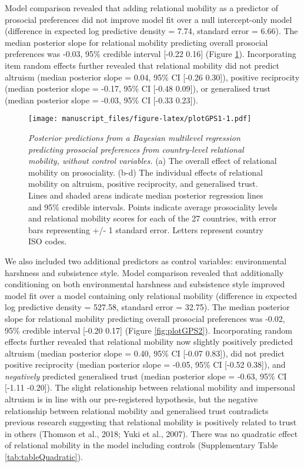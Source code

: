 \documentclass[
  man,floatsintext]{apa6}
\begin{document}
Model comparison revealed that adding relational mobility as a predictor of prosocial preferences did not improve model fit over a null intercept-only model (difference in expected log predictive density = 7.74, standard error = 6.66). The median posterior slope for relational mobility predicting overall prosocial preferences was -0.03, 95\% credible interval {[}-0.22 0.16{]} (Figure \ref{fig:plotGPS1}). Incorporating item random effects further revealed that relational mobility did not predict altruism (median posterior slope = 0.04, 95\% CI {[}-0.26 0.30{]}), positive reciprocity (median posterior slope = -0.17, 95\% CI {[}-0.48 0.09{]}), or generalised trust (median posterior slope = -0.03, 95\% CI {[}-0.33 0.23{]}).



\begin{figure}
\centering
\texttt{[image: manuscript\_files/figure-latex/plotGPS1-1.pdf]}
\caption{\label{fig:plotGPS1}\emph{Posterior predictions from a Bayesian multilevel regression predicting prosocial preferences from country-level relational mobility, without control variables.} (a) The overall effect of relational mobility on prosociality. (b-d) The individual effects of relational mobility on altruism, positive reciprocity, and generalised trust. Lines and shaded areas indicate median posterior regression lines and 95\% credible intervals. Points indicate average prosociality levels and relational mobility scores for each of the 27 countries, with error bars representing +/- 1 standard error. Letters represent country ISO codes.}
\end{figure}

We also included two additional predictors as control variables: environmental harshness and subsistence style. Model comparison revealed that additionally conditioning on both environmental harshness and subsistence style improved model fit over a model containing only relational mobility (difference in expected log predictive density = 527.58, standard error = 32.75). The median posterior slope for relational mobility predicting overall prosocial preferences was -0.02, 95\% credible interval {[}-0.20 0.17{]} (Figure \ref{fig:plotGPS2}). Incorporating random effects further revealed that relational mobility now slightly positively predicted altruism (median posterior slope = 0.40, 95\% CI {[}-0.07 0.83{]}), did not predict positive reciprocity (median posterior slope = -0.05, 95\% CI {[}-0.52 0.38{]}), and \emph{negatively} predicted generalised trust (median posterior slope = -0.63, 95\% CI {[}-1.11 -0.20{]}). The slight relationship between relational mobility and impersonal altruism is in line with our pre-registered hypothesis, but the negative relationship between relational mobility and generalised trust contradicts previous research suggesting that relational mobility is positively related to trust in others (Thomson et al., 2018; Yuki et al., 2007). There was no quadratic effect of relational mobility in the model including controls (Supplementary Table \ref{tab:tableQuadratic}).
\end{document}
